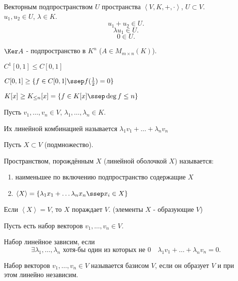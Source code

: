 \begin{definition} \thmslashn 

Векторным подпространством $U$ пространства $\left<V, K, +, \cdot \right>$, $U \subset V$.\\
$u_1, u_2\in U$, $\lambda\in K$.
\[ u_1 + u_2\in U .\]
\[ \lambda u_1\in U .\]
\[ 0\in U .\] 
\end{definition}
\begin{example} \thmslashn
    
    $\Ker A$ - подпространство в $K^{n}$ ($A\in M_{m \times n}(K)$).

    $C^{1}[0, 1] \le C[0, 1]$ 

$C[0, 1] \ge \{f\in C[0, 1]\ssep f(\frac{1}{2}) = 0\} $ 

$K[x] \ge K_{\le n}[x] = \{f\in K[x] \ssep \deg f \le n\} $  
\end{example}
\begin{definition} \thmslashn 

    Пусть $v_1, \ldots, v_{n}\in V$, $\lambda_1, \ldots, \lambda_{n}\in K$.

    Их линейной комбинацией называется $\lambda_1v_1 + \ldots + \lambda_{n}v_{n}$
\end{definition}
\begin{definition} \thmslashn 

    Пусть $X \subset V$ (подмножество).

    Пространством, порождённым $X$ (линейной оболочкой $X$) называется:
    \begin{enumerate}
        \item наименьшее по включению подпространство содержащие $X$
        \item $\left<X\right> = \{\lambda_1x_1 + \ldots \lambda_{n}x_{n}\ssep x_{i}\in X\} $
    \end{enumerate}
\end{definition}
\begin{definition} \thmslashn 

    Если $\left<X\right> = V$, то $X$ пораждает $V$. (элементы $X$ - образующие $V$)
\end{definition}
\begin{definition} \thmslashn 

Пусть есть набор векторов $v_1, \ldots, v_{n}\in V$.

Набор линейное зависим, если 
\[ \exists{\lambda_1, \ldots, \lambda_{n} \text{ хотя-бы один из которых не $0$}}\quad \lambda_1v_1 + \ldots + \lambda_{n}v_{n} = 0 .\] 
\end{definition}
\begin{definition} \thmslashn 

Набор векторов $v_1, \ldots, v_{n}\in V$ называется базисом $V$, если он образует $V$ и при этом линейно независим.
\end{definition}
